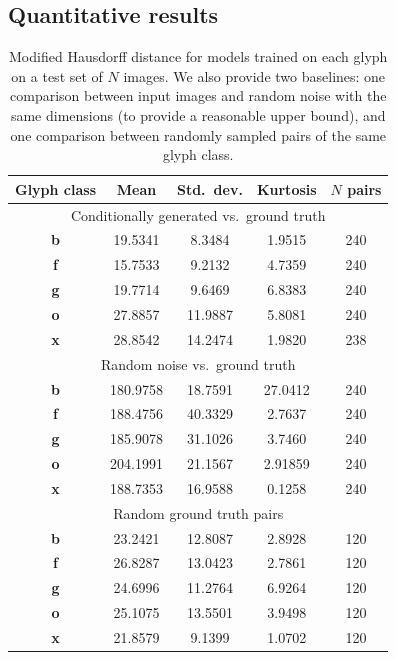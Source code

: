 \subsection{Quantitative results}\label{sec:quant-eval}
\begin{table}[h]
\centering
\caption[Quantitative results for models trained on letter glyphs]
    {Modified Hausdorff distance for models trained on each glyph on a test set of $N$ images.
    We also provide two baselines: one comparison between input images and random noise with the same dimensions (to provide a reasonable upper bound), and one comparison between randomly sampled pairs of the same glyph class.
    \label{tbl:model-results}}
\begin{tabular}{c c c c c}
\toprule
    Glyph class & Mean & Std.\ dev. & Kurtosis & $N$ pairs \\ \midrule
    \multicolumn{5}{c}{Conditionally generated vs.\ ground truth} \\ \midrule
    \textbf{b} & 19.5341 & 8.3484 & 1.9515 & 240 \\
    \textbf{f} & 15.7533 & 9.2132 & 4.7359 & 240 \\
    \textbf{g} & 19.7714 & 9.6469 & 6.8383 & 240 \\
    \textbf{o} & 27.8857 & 11.9887 & 5.8081 & 240 \\
    \textbf{x} & 28.8542 & 14.2474 & 1.9820 & 238 \\ \midrule
    \multicolumn{5}{c}{Random noise vs.\ ground truth} \\ \midrule
    \textbf{b} & 180.9758 & 18.7591 & 27.0412 & 240 \\
    \textbf{f} & 188.4756 & 40.3329 & 2.7637 & 240 \\
    \textbf{g} & 185.9078 & 31.1026 & 3.7460 & 240 \\
    \textbf{o} & 204.1991 & 21.1567 & 2.91859 & 240 \\
    \textbf{x} & 188.7353 & 16.9588 & 0.1258 & 240 \\ \midrule
    \multicolumn{5}{c}{Random ground truth pairs} \\ \midrule
    \textbf{b} & 23.2421 & 12.8087 & 2.8928 & 120 \\
    \textbf{f} & 26.8287 & 13.0423 & 2.7861 & 120 \\
    \textbf{g} & 24.6996 & 11.2764 & 6.9264 & 120 \\
    \textbf{o} & 25.1075 & 13.5501 & 3.9498 & 120 \\
    \textbf{x} & 21.8579 & 9.1399 & 1.0702 & 120 \\
\end{tabular}
\end{table}

